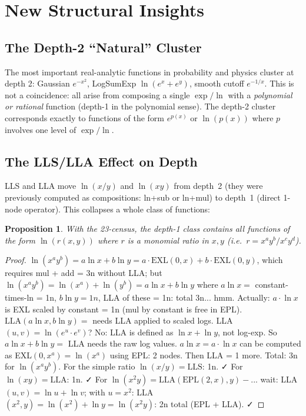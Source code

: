 \documentclass[11pt]{article}
\newtheorem{proposition}[theorem]{Proposition}
\begin{document}
\section{New Structural Insights}
\label{sec:insights}

\subsection{The Depth-2 ``Natural'' Cluster}

The most important real-analytic functions in probability and physics cluster at depth 2:
Gaussian $e^{-x^2}$, LogSumExp $\ln(e^x + e^y)$, smooth cutoff $e^{-1/x}$.
This is not a coincidence: all arise from composing a single $\exp/\ln$ with a
\emph{polynomial or rational} function (depth-1 in the polynomial sense).
The depth-2 cluster corresponds exactly to functions of the form $e^{p(x)}$ or
$\ln(p(x))$ where $p$ involves one level of $\exp/\ln$.

\subsection{The LLS/LLA Effect on Depth}

LLS and LLA move $\ln(x/y)$ and $\ln(xy)$ from depth~2 (they were previously
computed as compositions: ln+sub or ln+mul) to depth~1 (direct 1-node operator).
This collapses a whole class of functions:

\begin{proposition}
With the 23-census, the depth-1 class contains all functions of the form
$\ln(r(x,y))$ where $r$ is a monomial ratio in $x, y$ (i.e.\ $r = x^a y^b / x^c y^d$).
\end{proposition}

\begin{proof}
$\ln(x^a y^b) = a\ln x + b\ln y = a\cdot\mathrm{EXL}(0,x) + b\cdot\mathrm{EXL}(0,y)$,
which requires mul + add = 3n without LLA;
but $\ln(x^a y^b) = \ln(x^a) + \ln(y^b) = a\ln x + b\ln y$ where $a\ln x = $ constant-times-ln = 1n,
$b\ln y = 1n$, LLA of these = 1n: total 3n... hmm.
Actually: $a \cdot \ln x$ is EXL scaled by constant = 1n (mul by constant is free in EPL).
$\mathrm{LLA}(a\ln x, b\ln y) = $ needs LLA applied to scaled logs. LLA$(u,v) = \ln(e^u \cdot e^v)$?
No: LLA is defined as $\ln x + \ln y$, not log-exp. So $a\ln x + b\ln y = $ LLA needs the raw log values.
$a\ln x = a\cdot \ln x$ can be computed as EXL$(0, x^a) = \ln(x^a)$ using EPL: 2 nodes.
Then LLA = 1 more. Total: 3n for $\ln(x^a y^b)$.
For the simple ratio $\ln(x/y) = \mathrm{LLS}$: 1n. ✓
For $\ln(xy) = \mathrm{LLA}$: 1n. ✓
For $\ln(x^2 y) = \mathrm{LLA}(\mathrm{EPL}(2, x), y) - $... wait:
LLA$(u,v) = \ln u + \ln v$; with $u = x^2$: LLA$(x^2, y) = \ln(x^2) + \ln y = \ln(x^2 y)$: 2n total (EPL + LLA). ✓
\end{proof}
\end{document}
